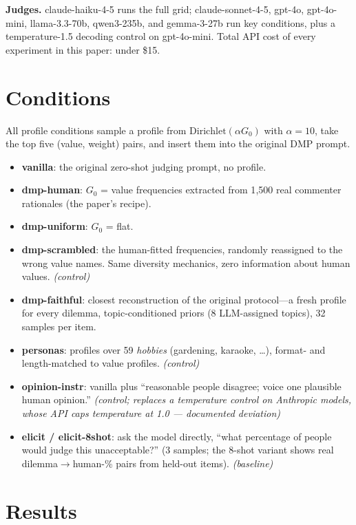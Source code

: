 \documentclass{article}
\begin{document}
\textbf{Judges.} claude-haiku-4-5 runs the full grid; claude-sonnet-4-5, gpt-4o, gpt-4o-mini, llama-3.3-70b, qwen3-235b, and gemma-3-27b run key conditions, plus a temperature-1.5 decoding control on gpt-4o-mini. Total API cost of every experiment in this paper: under \$15.

\section{Conditions}
\label{sec:conditions}

All profile conditions sample a profile from $\mathrm{Dirichlet}(\alpha G_0)$ with $\alpha=10$, take the top five (value, weight) pairs, and insert them into the original DMP prompt.

\begin{itemize}
  \item \textbf{vanilla}: the original zero-shot judging prompt, no profile.
  \item \textbf{dmp-human}: $G_0$ = value frequencies extracted from 1{,}500 real commenter rationales (the paper's recipe).
  \item \textbf{dmp-uniform}: $G_0$ = flat.
  \item \textbf{dmp-scrambled}: the human-fitted frequencies, randomly reassigned to the wrong value names. Same diversity mechanics, zero information about human values. \emph{(control)}
  \item \textbf{dmp-faithful}: closest reconstruction of the original protocol---a fresh profile for every dilemma, topic-conditioned priors (8 LLM-assigned topics), 32 samples per item.
  \item \textbf{personas}: profiles over 59 \emph{hobbies} (gardening, karaoke, \dots), format- and length-matched to value profiles. \emph{(control)}
  \item \textbf{opinion-instr}: vanilla plus ``reasonable people disagree; voice one plausible human opinion.'' \emph{(control; replaces a temperature control on Anthropic models, whose API caps temperature at 1.0 --- documented deviation)}
  \item \textbf{elicit / elicit-8shot}: ask the model directly, ``what percentage of people would judge this unacceptable?'' (3 samples; the 8-shot variant shows real dilemma$\to$human-\% pairs from held-out items). \emph{(baseline)}
\end{itemize}

\section{Results}
\end{document}
